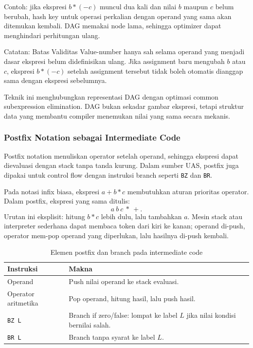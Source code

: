 Contoh: jika ekspresi $b*(-c)$ muncul dua kali dan nilai $b$ maupun $c$ belum berubah, hash key untuk operasi perkalian dengan operand yang sama akan ditemukan kembali. DAG memakai node lama, sehingga optimizer dapat menghindari perhitungan ulang.

\begin{cmt}{Catatan: Batas Validitas}{}
Value-number hanya sah selama operand yang menjadi dasar ekspresi belum didefinisikan ulang. Jika assignment baru mengubah $b$ atau $c$, ekspresi $b*(-c)$ setelah assignment tersebut tidak boleh otomatis dianggap sama dengan ekspresi sebelumnya.
\end{cmt}

Teknik ini menghubungkan representasi DAG dengan optimasi common subexpression elimination. DAG bukan sekadar gambar ekspresi, tetapi struktur data yang membantu compiler menemukan nilai yang sama secara mekanis.

\subsubsection{Postfix Notation sebagai Intermediate Code}

\begin{jawab}
Postfix notation menuliskan operator setelah operand, sehingga ekspresi dapat dievaluasi dengan stack tanpa tanda kurung. Dalam sumber UAS, postfix juga dipakai untuk control flow dengan instruksi branch seperti \texttt{BZ} dan \texttt{BR}.
\end{jawab}

Pada notasi infix biasa, ekspresi $a+b*c$ membutuhkan aturan prioritas operator. Dalam postfix, ekspresi yang sama ditulis:
\[
    a\ b\ c\ *\ +.
\]
Urutan ini eksplisit: hitung $b*c$ lebih dulu, lalu tambahkan $a$. Mesin stack atau interpreter sederhana dapat membaca token dari kiri ke kanan; operand di-push, operator mem-pop operand yang diperlukan, lalu hasilnya di-push kembali.

\begin{table}[H]
\centering
\begin{tabularx}{\textwidth}{|L{0.22\textwidth}|X|}
\hline
\textbf{Instruksi} & \textbf{Makna} \\
\hline
Operand & Push nilai operand ke stack evaluasi. \\
\hline
Operator aritmetika & Pop operand, hitung hasil, lalu push hasil. \\
\hline
\texttt{BZ L} & Branch if zero/false: lompat ke label $L$ jika nilai kondisi bernilai salah. \\
\hline
\texttt{BR L} & Branch tanpa syarat ke label $L$. \\
\hline
\end{tabularx}
\caption{Elemen postfix dan branch pada intermediate code}
\label{tab:postfix-bz-br}
\end{table}

